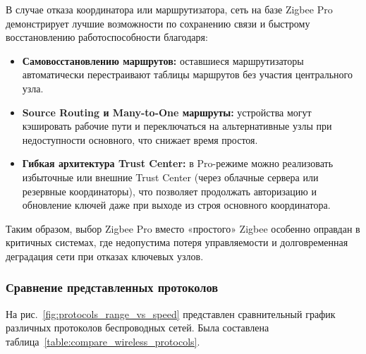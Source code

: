 \documentclass[a4paper,12pt]{article}
\begin{document}
В случае отказа координатора или маршрутизатора, сеть на базе Zigbee Pro демонстрирует лучшие возможности по сохранению связи и быстрому восстановлению работоспособности \cite{Fault_Tolerance_ZigBee} благодаря:
\begin{itemize}
  \item \textbf{Самовосстановлению маршрутов:} оставшиеся маршрутизаторы автоматически перестраивают таблицы маршрутов без участия центрального узла.
  \item \textbf{Source Routing и Many-to-One маршруты:} устройства могут кэшировать рабочие пути и переключаться на альтернативные узлы при недоступности основного, что снижает время простоя.
  \item \textbf{Гибкая архитектура Trust Center:} в Pro-режиме можно реализовать избыточные или внешние Trust Center (через облачные сервера или резервные координаторы), что позволяет продолжать авторизацию и обновление ключей даже при выходе из строя основного координатора.
\end{itemize}

Таким образом, выбор Zigbee Pro вместо «простого» Zigbee особенно оправдан в критичных системах, где недопустима потеря управляемости и долговременная деградация сети при отказах ключевых узлов.  




\subsubsection{Сравнение представленных протоколов}
На рис.~\ref{fig:protocols_range_vs_speed} представлен сравнительный график различных протоколов беспроводных сетей. Была составлена таблица~\ref{table:compare_wireless_protocols}.
\end{document}
